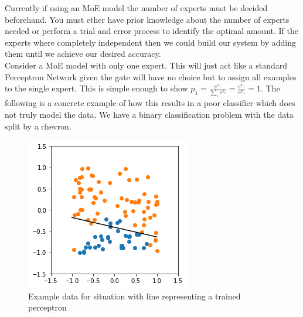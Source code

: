 \documentclass[notitlepage]{report}
\theoremstyle{definition}
\begin{document}
Currently if using an MoE model the number of experts must be decided beforehand. You must ether have prior knowledge about the number of experts needed or perform a trial and error process to identify the optimal amount. If the experts where completely independent then we could build our system by adding them until we achieve our desired accuracy.\\

Consider a MoE model with only one expert. This will just act like a standard Perceptron Network given the gate will have no choice but to assign all examples to the single expert. This is simple enough to show $p_1 = \frac{e^{x_1}}{\sum_i e^{x_i}} = \frac{e^{x_1}}{e^{x_1}} = 1$. The following is a concrete example of how this results in a poor classifier which does not truly model the data. We have a binary classification problem with the data split by a chevron. 

\begin{figure}[H]
	\centering
	\begin{minipage}[b]{0.5\textwidth}
		\includegraphics[width=\textwidth]{Standard-Perceptron.png}
		\caption{Example data for situation with line representing a trained perceptron}
		\label{fig:intro-concrete-example}
	\end{minipage}
	\hfill
\end{figure}
\end{document}
